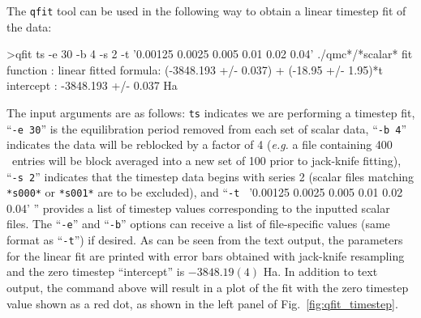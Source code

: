 The \texttt{qfit} tool can be used in the following way to obtain
a linear timestep fit of the data:
\begin{shade}
>qfit ts -e 30 -b 4 -s 2 -t '0.00125 0.0025 0.005 0.01 0.02 0.04' ./qmc*/*scalar*
fit function  : linear
fitted formula: (-3848.193 +/- 0.037) + (-18.95 +/- 1.95)*t
intercept     : -3848.193 +/- 0.037  Ha
\end{shade}
The input arguments are as follows: \texttt{ts} indicates we are
performing a timestep fit, ``\texttt{-e 30}'' is the equilibration period
removed from each set of scalar data, ``\texttt{-b 4}'' indicates the data
will be reblocked by a factor of 4 (\emph{e.g.} a file containing 400 \
entries will be block averaged into a new set of 100 prior to jack-knife
fitting), ``\texttt{-s 2}'' indicates that the timestep data begins with
series 2 (scalar files matching \texttt{*s000*} or \texttt{*s001*} are
to be excluded), and ``\texttt{-t } '0.00125 0.0025 0.005 0.01 0.02 0.04' ''
provides a list of timestep values corresponding to the inputted scalar
files.  The ``\texttt{-e}'' and ``\texttt{-b}'' options can receive a
list of file-specific values (same format as ``\texttt{-t}'') if desired.
As can be seen from the text output, the parameters for the linear fit
are printed with error bars obtained with jack-knife resampling and
the zero timestep ``intercept'' is $-3848.19(4)$ Ha.  In addition to
text output, the command above will result in a plot of the fit with
the zero timestep value shown as a red dot, as shown in the left
panel of Fig.~\ref{fig:qfit_timestep}.

